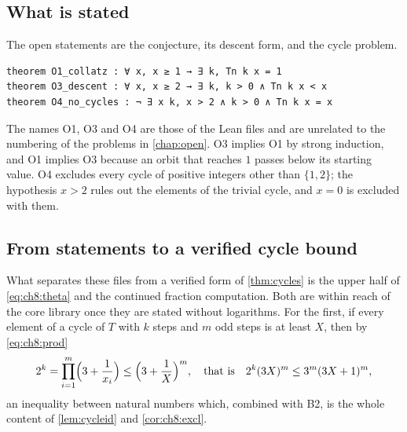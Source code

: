 \subsection{What is stated}

The open statements are the conjecture, its descent form, and the cycle
problem.

\begin{lstlisting}[style=ch8lean]
theorem O1_collatz : ∀ x, x ≥ 1 → ∃ k, Tn k x = 1
theorem O3_descent : ∀ x, x ≥ 2 → ∃ k, k > 0 ∧ Tn k x < x
theorem O4_no_cycles : ¬ ∃ x k, x > 2 ∧ k > 0 ∧ Tn k x = x
\end{lstlisting}

\noindent The names O1, O3 and O4 are those of the Lean files and are unrelated to the numbering of the problems in \cref{chap:open}.
O3 implies O1 by strong induction, and O1 implies O3 because an orbit that
reaches $1$ passes below its starting value. O4 excludes every cycle of
positive integers other than $\{1,2\}$; the hypothesis $x>2$ rules out the
elements of the trivial cycle, and $x=0$ is excluded with them.

\subsection{From statements to a verified cycle bound}

What separates these files from a verified form of \cref{thm:cycles} is the
upper half of \eqref{eq:ch8:theta} and the continued fraction computation.
Both are within reach of the core library once they are stated without
logarithms. For the first, if every element of a cycle of $T$ with $k$ steps
and $m$ odd steps is at least $X$, then by \eqref{eq:ch8:prod}
\[
  2^k=\prod_{i=1}^{m}\Bigl(3+\frac1{x_i}\Bigr)\leq\Bigl(3+\frac1X\Bigr)^m,
  \quad\text{that is}\quad 2^k(3X)^m\leq3^m(3X+1)^m,
\]
an inequality between natural numbers which, combined with B2, is the whole
content of \cref{lem:cycleid} and \cref{cor:ch8:excl}.

